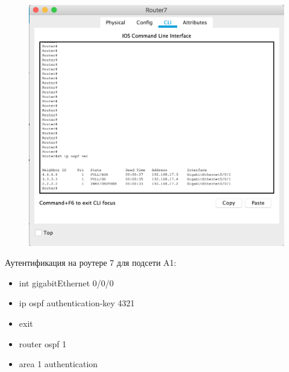 \documentclass[a4paper,12pt]{article}
\begin{document}
	\begin{figure}[h!]
		\begin{center}
			{\includegraphics[scale = 0.6]{img/6.png}}
			\caption{}
			\label{ris:6}
		\end{center}
	\end{figure}

	Аутентификация на роутере 7 для подсети A1:
	
	\begin{itemize}
		\item int gigabitEthernet 0/0/0
		\item ip ospf authentication-key 4321
		\item exit
		\item router ospf 1
		\item area 1 authentication
	\end{itemize}
\end{document}
